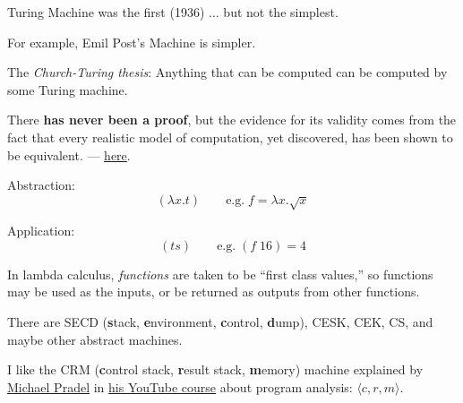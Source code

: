 \documentclass{article}
\begin{document}

\plush{}


Turing Machine was the first (1936) ... but not the simplest.


For example, Emil Post's Machine is simpler.

\plush{}


The \emph{Church-Turing thesis}: Anything that can be computed can be computed by some Turing machine.

There \textbf{has never been a proof}, but the evidence for its validity comes from the fact that every realistic model of computation, yet discovered, has been shown to be equivalent. --- \href{https://mathworld.wolfram.com/Church-TuringThesis.html}{here}.

\plush{}


Abstraction:
\begin{equation*}
(\lambda x . t)\quad\quad \text{e.g.}\; f = \lambda x . \sqrt{x}
\end{equation*}

Application:
\begin{equation*}
(t s)\quad\quad \text{e.g.}\; (f\;16) = 4
\end{equation*}

In lambda calculus, \emph{functions} are taken to be ``first class values,''
so functions may be used as the inputs, or be returned as outputs from other functions.

\plush{}


There are SECD (\textbf{s}tack, \textbf{e}nvironment, \textbf{c}ontrol, \textbf{d}ump),
CESK, CEK, CS, and maybe other abstract machines.

I like the CRM (\textbf{c}ontrol stack, \textbf{r}esult stack, \textbf{m}emory) machine explained by
\href{https://software-lab.org/people/Michael_Pradel.html}{Michael Pradel} in
\href{https://www.youtube.com/watch?v=YRfb2zDk_qs}{his YouTube course} about program analysis:
$\langle c, r, m\rangle$.
\end{document}
